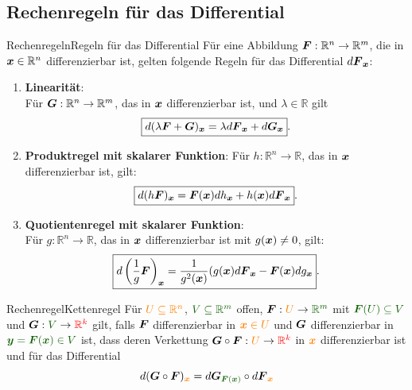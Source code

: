 \subsection{Rechenregeln für das Differential}
\begin{Satz}
{Rechenregeln}{Regeln für das Differential}
Für eine Abbildung ${{\text{\boldmath${F}$}}}:\mathbb{R}^n\to\mathbb{R}^m$, die in ${{\text{\boldmath${x}$}}}\in\mathbb{R}^n$ differenzierbar ist, gelten folgende Regeln für das Differential $d{{\text{\boldmath${F}$}}}_{{\text{\boldmath${x}$}}}$:
\begin{enumerate}
    \item \textbf{Linearität}:\\
    Für ${{\text{\boldmath${G}$}}}:\mathbb{R}^n\to\mathbb{R}^m$, das in ${{\text{\boldmath${x}$}}}$ differenzierbar ist, und $\lambda\in\mathbb{R}$ gilt
    \begin{equation*}
        \boxed{d(\lambda{{\text{\boldmath${F}$}}}+{{\text{\boldmath${G}$}}})_{{\text{\boldmath${x}$}}}=\lambda d{{\text{\boldmath${F}$}}}_{{\text{\boldmath${x}$}}}+d{{\text{\boldmath${G}$}}}_{{\text{\boldmath${x}$}}}}.
    \end{equation*}
    \item \textbf{Produktregel mit skalarer Funktion}:
    Für $h:\mathbb{R}^n\to\mathbb{R}$, das in ${{\text{\boldmath${x}$}}}$ differenzierbar ist, gilt:
    \begin{equation*}
        \boxed{d(h{{\text{\boldmath${F}$}}})_{{\text{\boldmath${x}$}}}={{\text{\boldmath${F}$}}}({{\text{\boldmath${x}$}}})dh_{{\text{\boldmath${x}$}}}+h({{\text{\boldmath${x}$}}})d{{\text{\boldmath${F}$}}}_{{\text{\boldmath${x}$}}}}.
    \end{equation*}
    \item \textbf{Quotientenregel mit skalarer Funktion}:\\
    Für $g:\mathbb{R}^n\to\mathbb{R}$, das in ${{\text{\boldmath${x}$}}}$ differenzierbar ist mit $g({{\text{\boldmath${x}$}}})\neq0$, gilt:
    \begin{equation*}
        \boxed{d\left({\frac{1}{g}{{\text{\boldmath${F}$}}}}\right)_{{\text{\boldmath${x}$}}}=\frac{1}{g^2({{\text{\boldmath${x}$}}})}(g({{\text{\boldmath${x}$}}})d{{\text{\boldmath${F}$}}}_{{\text{\boldmath${x}$}}}-{{\text{\boldmath${F}$}}}({{\text{\boldmath${x}$}}})dg_{{\text{\boldmath${x}$}}}}.
    \end{equation*}
\end{enumerate}
\end{Satz}
\begin{Satz}
{Rechenregel}{Kettenregel}
Für $\textcolor{orange}{U\subseteq \mathbb{R}^n}$, $\textcolor{mygreen}{V\subseteq\mathbb{R}^m}$ offen, $\Fvec:\textcolor{orange}{U}\to\textcolor{mygreen}{\mathbb{R}^m}$ mit $\textcolor{mygreen}{\Fvec(U)\subseteq V}$ und $\Gvec:\textcolor{mygreen}{V}\to\textcolor{red}{\mathbb{R}^k}$ gilt, falls ${{\text{\boldmath${F}$}}}$ differenzierbar in $\textcolor{orange}{{{\text{\boldmath${x}$}}}\in U}$ und ${{\text{\boldmath${G}$}}}$ differenzierbar in $\textcolor{mygreen}{\yvec=\Fvec(\xvec)\in V}$ ist, dass deren Verkettung ${{\text{\boldmath${G}$}}}\circ{{\text{\boldmath${F}$}}}: \textcolor{orange}{U}\to\textcolor{red}{\mathbb{R}^k}$ in $\textcolor{orange}{{{\text{\boldmath${x}$}}}}$ differenzierbar ist und für das Differential
\begin{equation}
    d(\Gvec\circ\Fvec)_{\textcolor{orange}{\xvec}}= d\Gvec_{\textcolor{mygreen}{\Fvec(\xvec)}}\circ d\Fvec_{\textcolor{orange}{\xvec}}
\end{equation}
\end{Satz}
